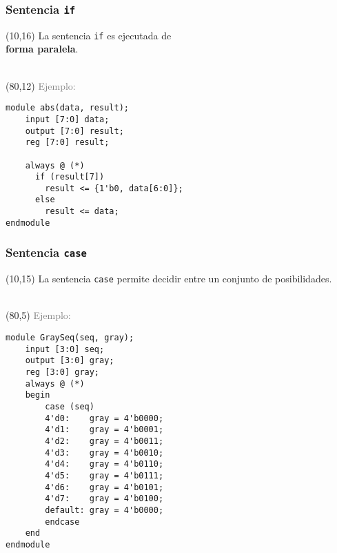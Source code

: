 \documentclass[aspectratio=169]{beamer}
\begin{document}
\begin{frame}[fragile,t]
    \frametitle{Sentencia \texttt{if}}
    \begin{textblock}{65}(10,16)
    La sentencia \texttt{if} es ejecutada de\\ \textbf{forma paralela}.\\
    \bigskip
    \\
    \bigskip
    \end{textblock}
    \begin{textblock}{70}(80,12)
    \textcolor{gray}{Ejemplo:}\\
\begin{lstlisting}
module abs(data, result);
    input [7:0] data;
    output [7:0] result;
    reg [7:0] result;

    always @ (*)
      if (result[7])
        result <= {1'b0, data[6:0]};
      else
        result <= data;
endmodule
\end{lstlisting}
    \end{textblock}
\end{frame}

\begin{frame}[fragile,t]
    \frametitle{Sentencia \texttt{case}}
    \begin{textblock}{60}(10,15)
    La sentencia \texttt{case} permite decidir entre un conjunto de posibilidades.\\
    \bigskip
    \\
    \bigskip
    \end{textblock}
    \begin{textblock}{65}(80,5)
    \textcolor{gray}{Ejemplo:}\\
\begin{lstlisting}
module GraySeq(seq, gray);
    input [3:0] seq;
    output [3:0] gray;
    reg [3:0] gray;
    always @ (*)
    begin
        case (seq)
        4'd0:    gray = 4'b0000;
        4'd1:    gray = 4'b0001;
        4'd2:    gray = 4'b0011;
        4'd3:    gray = 4'b0010;
        4'd4:    gray = 4'b0110;
        4'd5:    gray = 4'b0111;
        4'd6:    gray = 4'b0101;
        4'd7:    gray = 4'b0100;
        default: gray = 4'b0000;
        endcase
    end
endmodule
\end{lstlisting}
    \end{textblock}
\end{frame}
\end{document}
